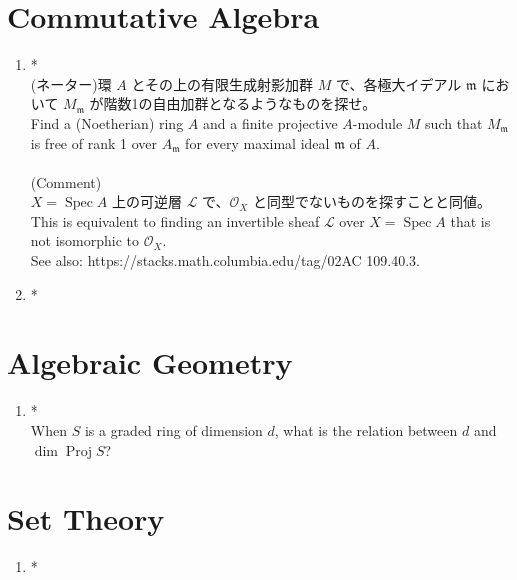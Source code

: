 \documentclass{jsarticle}
\begin{document}
    \section{Commutative Algebra}
    \begin{enumerate}[\textrm{1.}1]
        \item *\ \\
        (ネーター)環 $A$ とその上の有限生成射影加群 $M$ で、各極大イデアル $\mathfrak{m}$ において $M_{\mathfrak{m}}$ が階数1の自由加群となるようなものを探せ。\\
        Find a (Noetherian) ring $A$ and a finite projective $A$-module $M$ such that $M_{\mathfrak{m}}$ is free of rank 1 over $A_{\mathfrak{m}}$ for every maximal ideal $\mathfrak{m}$ of $A$. \\
        \\
        (Comment) \\ 
        $X = \operatorname{Spec} A$ 上の可逆層 $\mathcal{L}$ で、$\mathcal{O}_X$ と同型でないものを探すことと同値。\\
        This is equivalent to finding an invertible sheaf $\mathcal{L}$ over $X = \operatorname{Spec} A$ that is not isomorphic to $\mathcal{O}_X$.  \\
        See also: https://stacks.math.columbia.edu/tag/02AC 109.40.3. \\
      
        \item *\ \\
    \end{enumerate}
  
    \section{Algebraic Geometry}
    \begin{enumerate}[\textrm{2.}1]
        \item *\ \\
        When $S$ is a graded ring of dimension $d$, what is the relation between $d$ and $\dim \operatorname{Proj} S$? \\
    \end{enumerate}
  
    \section{Set Theory}
    \begin{enumerate}[\textrm{3.}1]
        \item *\ \\
    \end{enumerate}
\end{document}
